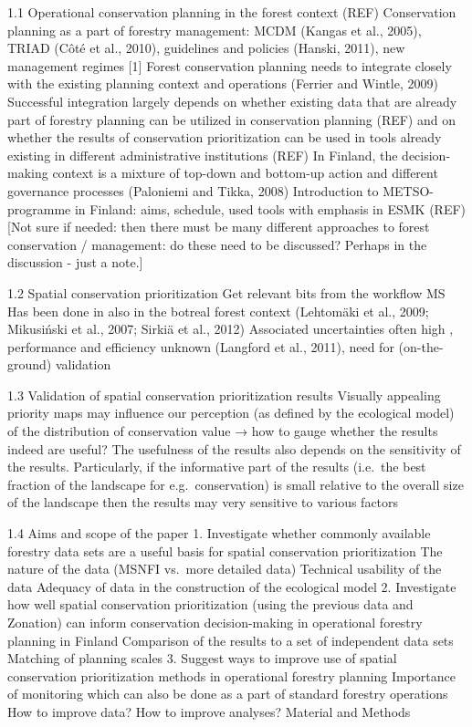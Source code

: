 \documentclass[]{article}
\begin{document}
1.1 Operational conservation planning in the forest context (REF)
Conservation planning as a part of forestry management: MCDM (Kangas et
al., 2005), TRIAD (Côté et al., 2010), guidelines and policies (Hanski,
2011), new management regimes {[}1{]} Forest conservation planning needs
to integrate closely with the existing planning context and operations
(Ferrier and Wintle, 2009) Successful integration largely depends on
whether existing data that are already part of forestry planning can be
utilized in conservation planning (REF) and on whether the results of
conservation prioritization can be used in tools already existing in
different administrative institutions (REF) In Finland, the
decision-making context is a mixture of top-down and bottom-up action
and different governance processes (Paloniemi and Tikka, 2008)
Introduction to METSO-programme in Finland: aims, schedule, used tools
with emphasis in ESMK (REF) {[}Not sure if needed: then there must be
many different approaches to forest conservation / management: do these
need to be discussed? Perhaps in the discussion - just a note.{]}

1.2 Spatial conservation prioritization Get relevant bits from the
workflow MS Has been done in also in the botreal forest context
(Lehtomäki et al., 2009; Mikusiński et al., 2007; Sirkiä et al., 2012)⁠
Associated uncertainties often high , performance and efficiency unknown
(Langford et al., 2011), need for (on-the-ground) validation

1.3 Validation of spatial conservation prioritization results Visually
appealing priority maps may influence our perception (as defined by the
ecological model) of the distribution of conservation value → how to
gauge whether the results indeed are useful? The usefulness of the
results also depends on the sensitivity of the results. Particularly, if
the informative part of the results (i.e.~the best fraction of the
landscape for e.g.~conservation) is small relative to the overall size
of the landscape then the results may very sensitive to various factors

1.4 Aims and scope of the paper 1. Investigate whether commonly
available forestry data sets are a useful basis for spatial conservation
prioritization The nature of the data (MSNFI vs.~more detailed data)
Technical usability of the data Adequacy of data in the construction of
the ecological model 2. Investigate how well spatial conservation
prioritization (using the previous data and Zonation) can inform
conservation decision-making in operational forestry planning in Finland
Comparison of the results to a set of independent data sets Matching of
planning scales 3. Suggest ways to improve use of spatial conservation
prioritization methods in operational forestry planning Importance of
monitoring which can also be done as a part of standard forestry
operations How to improve data? How to improve analyses? Material and
Methods
\end{document}
